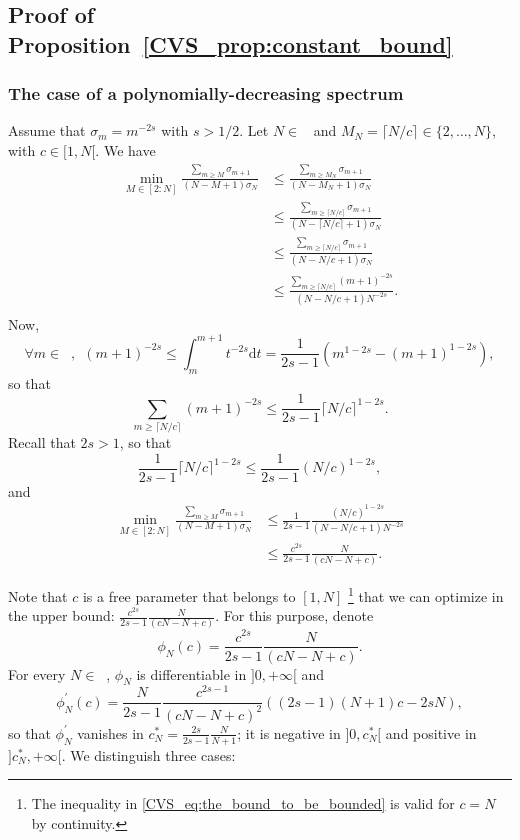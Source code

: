 \documentclass[twoside,11pt]{book}
\numberwithin{theorem}{chapter}
\numberwithin{definition}{chapter}
\numberwithin{proposition}{chapter}
\numberwithin{corollary}{chapter}
\numberwithin{example}{chapter}
\numberwithin{lemma}{chapter}
\numberwithin{assumption}{chapter}
\numberwithin{equation}{chapter}
\numberwithin{figure}{chapter}
\DeclareMathOperator{\Ns}{\mathbb{N}^{*}}
\begin{document}
\subsection{Proof of Proposition~\ref{CVS_prop:constant_bound}}
\subsubsection{The case of a polynomially-decreasing spectrum}
Assume that $\sigma_{m} = m^{-2s}$ with $s>1/2$.
Let $N \in \Ns$ and $M_{N} = \lceil{N/c \rceil} \in \{2,\dots,N\}$, with $c \in [1,N[$.
We have
\begin{align}
\min_{M \in [2:N]}\frac{\sum_{m \geq M} \sigma_{m+1}}{(N-M+1)\sigma_N} & \leq \frac{\sum_{m \geq M_N} \sigma_{m+1}}{(N-M_N+1)\sigma_N} \\
& \leq \frac{\sum_{m \geq \lceil{N/c\rceil}} \sigma_{m+1}}{(N-\lceil{N/c\rceil}+1)\sigma_N} \\
& \leq \frac{\sum_{m \geq \lceil{N/c\rceil}} \sigma_{m+1}}{(N-N/c+1)\sigma_N}\\
& \leq \frac{\sum_{m \geq \lceil{N/c\rceil}} (m+1)^{-2s}}{(N-N/c+1)N^{-2s}}.\\
\end{align}
Now,
\begin{equation}
\forall m \in \Ns, \:\: (m+1)^{-2s} \leq \int_{m}^{m+1}t^{-2s} \mathrm{d}t = \frac{1}{2s-1}(m^{1-2s}-(m+1)^{1-2s}),
\end{equation}
so that
\begin{equation}
\sum\limits_{m \geq \lceil{N/c\rceil}} (m+1)^{-2s} \leq \frac{1}{2s-1}\lceil{N/c\rceil}^{1-2s}.
\end{equation}
Recall that $2s>1$, so that
\begin{equation}
\frac{1}{2s-1}\lceil{N/c\rceil}^{1-2s} \leq \frac{1}{2s-1}(N/c)^{1-2s},
\end{equation}
and
\begin{align}
\min_{M \in [2:N]}\frac{\sum_{m \geq M} \sigma_{m+1}}{(N-M+1)\sigma_N}
& \leq \frac{1}{2s-1}\frac{(N/c)^{1-2s}}{(N-N/c+1)N^{-2s}}\\
& \leq \frac{c^{2s}}{2s-1}\frac{N}{(cN-N+c)} \label{CVS_eq:the_bound_to_be_bounded}.
\end{align}

Note that $c$ is a free parameter that belongs to $[1,N]$ \footnote{The inequality in \eqref{CVS_eq:the_bound_to_be_bounded} is valid for $c = N$ by continuity.} that we can optimize in the upper bound: $\frac{c^{2s}}{2s-1}\frac{N}{(cN-N+c)}$. For this purpose, denote
\begin{equation}
\phi_{N}(c) = \frac{c^{2s}}{2s-1}\frac{N}{(cN-N+c)}.
\end{equation}
For every $N \in \Ns$, $\phi_{N}$ is differentiable in $]0,+\infty[$ and
\begin{equation}
\phi_{N}^{'}(c) = \frac{N}{2s-1}\frac{c^{2s-1}}{(cN-N+c)^{2}} \left( (2s-1)(N+1) c - 2s N \right),
\end{equation}
so that $\phi_{N}^{'}$ vanishes in $c_{N}^{*} = \frac{2s}{2s-1} \frac{N}{N+1}$; it is negative in $]0,c_{N}^{*}[$ and positive in $]c_{N}^{*}, +\infty[$. We distinguish three cases:
\end{document}
